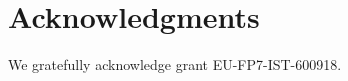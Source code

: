 \section{Acknowledgments}\label{sec:Acknowledgments}

We gratefully acknowledge grant EU-FP7-IST-600918.
